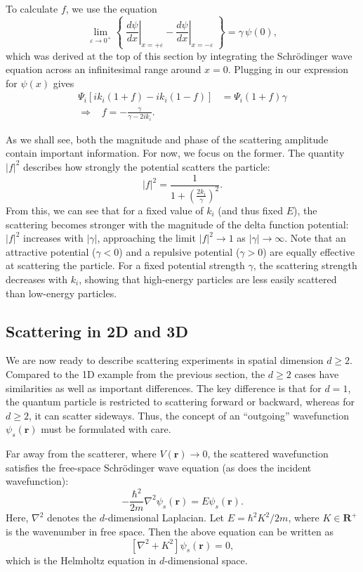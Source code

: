 \documentclass[pra,11pt]{revtex4}
\begin{document}
To calculate $f$, we use the equation
$$\lim_{\varepsilon\rightarrow 0^+} \left\{\; \left.\frac{d\psi}{dx}\right|_{x = +\varepsilon} - \left.\frac{d\psi}{dx}\right|_{x = -\varepsilon}\; \right\}  =  \gamma\, \psi(0),$$
which was derived at the top of this section by integrating the
Schr\"odinger wave equation across an infinitesimal range around $x =
0$.  Plugging in our expression for $\psi(x)$ gives
$$\begin{aligned}\Psi_i\left[ik_i(1+f) - ik_i(1-f)\right]  &=  \Psi_i(1+f) \gamma \\ \Rightarrow \;\;\; f = -\frac{\gamma}{\gamma - 2ik_i}.\end{aligned}$$

As we shall see, both the magnitude and phase of the scattering
amplitude contain important information.  For now, we focus on the
former.  The quantity $|f|^2$ describes how strongly the potential
scatters the particle:
$$|f|^2 = \frac{1}{1 + \left(\frac{2k_i}{\gamma}\right)^2}.$$
From this, we can see that for a fixed value of $k_i$ (and thus fixed
$E$), the scattering becomes stronger with the magnitude of the delta
function potential: $|f|^2$ increases with $|\gamma|$, approaching the
limit $|f|^2 \rightarrow 1$ as $|\gamma|\rightarrow \infty$.  Note
that an attractive potential ($\gamma < 0$) and a repulsive potential
($\gamma > 0$) are equally effective at scattering the particle.  For
a fixed potential strength $\gamma$, the scattering strength decreases
with $k_i$, showing that high-energy particles are less easily
scattered than low-energy particles.

\subsection{Scattering in 2D and 3D}

We are now ready to describe scattering experiments in spatial
dimension $d \ge 2$.  Compared to the 1D example from the previous
section, the $d \ge 2$ cases have similarities as well as important
differences.  The key difference is that for $d = 1$, the quantum
particle is restricted to scattering forward or backward, whereas for
$d \ge 2$, it can scatter sideways.  Thus, the concept of an
``outgoing'' wavefunction $\psi_s(\mathbf{r})$ must be formulated with
care.

Far away from the scatterer, where $V(\mathbf{r})\rightarrow 0$, the
scattered wavefunction satisfies the free-space Schr\"odinger wave
equation (as does the incident wavefunction):
$$-\frac{\hbar^2}{2m} \nabla^2 \psi_s(\mathbf{r}) = E \psi_s(\mathbf{r}).$$
Here, $\nabla^2$ denotes the $d$-dimensional Laplacian.  Let $E =
\hbar^2 K^2 / 2m$, where $K \in \mathbf{R}^+$ is the wavenumber in
free space.  Then the above equation can be written as
$$\left[\nabla^2 + K^2\right] \psi_s(\mathbf{r}) = 0,$$
which is the Helmholtz equation in $d$-dimensional space.
\end{document}
